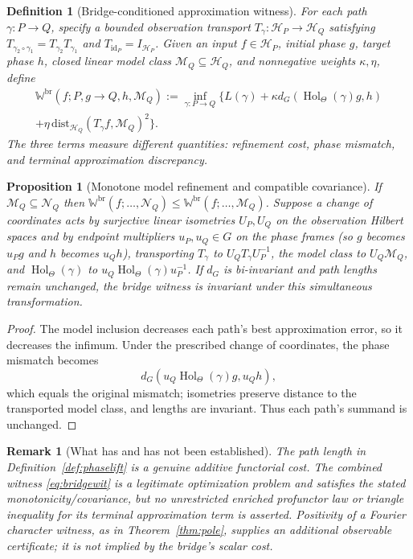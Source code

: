 \documentclass[11pt,letterpaper]{article}
\newtheorem{proposition}[theorem]{Proposition}
\newtheorem{definition}[theorem]{Definition}
\newtheorem{remark}[theorem]{Remark}
\newcommand{\HH}{\mathcal H}
\newcommand{\MM}{\mathcal M}
\newcommand{\WW}{\mathbb W}
\begin{document}
\begin{definition}[Bridge-conditioned approximation witness]\label{def:bridgewit}
For each path $\gamma:P\to Q$, specify a bounded observation transport
$T_\gamma:\HH_P\to\HH_Q$ satisfying
$T_{\gamma_2\circ\gamma_1}=T_{\gamma_2}T_{\gamma_1}$ and $T_{\mathrm{id}_P}=I_{\HH_P}$.
Given an input $f\in\HH_P$, initial phase $g$, target phase $h$,
closed linear model class $\MM_Q\subseteq\HH_Q$, and nonnegative
weights $\kappa,\eta$, define
\begin{multline}\label{eq:bridgewit}
\WW^{\mathrm{br}}(f;P,g\to Q,h,\MM_Q) :=\inf_{\gamma:P\to Q}\bigl\{
L(\gamma)+\kappa d_G(\operatorname{Hol}_\Theta(\gamma)g,h)\\
+\eta\,\mathrm{dist}_{\HH_Q}(T_\gamma f,\MM_Q)^2\bigr\}.
\end{multline}
The three terms measure different quantities: refinement cost, phase mismatch,
and terminal approximation discrepancy.
\end{definition}

\begin{proposition}[Monotone model refinement and compatible covariance]\label{prop:bridgewit}
If $\MM_Q\subseteq\mathcal N_Q$ then
$\WW^{\mathrm{br}}(f;\dots,\mathcal N_Q)\le
 \WW^{\mathrm{br}}(f;\dots,\MM_Q)$.
Suppose a change of coordinates acts by surjective linear isometries $U_P,U_Q$ on the
observation Hilbert spaces and by endpoint multipliers $u_P,u_Q\in G$
on the phase frames (so $g$ becomes $u_Pg$ and $h$ becomes $u_Qh$), transporting $T_\gamma$ to
$U_QT_\gamma U_P^{-1}$, the model class to $U_Q\MM_Q$, and
$\operatorname{Hol}_\Theta(\gamma)$ to
$u_Q\operatorname{Hol}_\Theta(\gamma)u_P^{-1}$.
If $d_G$ is bi-invariant and path lengths remain unchanged, the bridge
witness is invariant under this simultaneous transformation.
\end{proposition}
\begin{proof}
The model inclusion decreases each path's best approximation error,
so it decreases the infimum. Under the prescribed change of coordinates,
the phase mismatch becomes
\[d_G(u_Q\operatorname{Hol}_\Theta(\gamma)g,u_Qh),\]
which equals the original mismatch; isometries preserve distance to the
transported model class, and lengths are invariant. Thus each path's
summand is unchanged.
\end{proof}

\begin{remark}[What has and has not been established]
The path length in Definition~\ref{def:phaselift} is a genuine additive
functorial cost. The combined witness \eqref{eq:bridgewit} is a legitimate
optimization problem and satisfies the stated monotonicity/covariance, but
no unrestricted enriched profunctor law or triangle inequality for its
\emph{terminal approximation term} is asserted. Positivity of a Fourier
character witness, as in Theorem~\ref{thm:pole}, supplies an additional
observable certificate; it is not implied by the bridge's scalar cost.
\end{remark}
\end{document}
